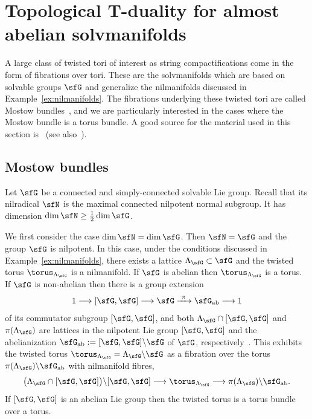 \section{Topological T-duality for almost abelian solvmanifolds}\label{sec:TdualityMostow}

A large class of twisted tori of interest as string compactifications
come in the form of fibrations over tori. These are the solvmanifolds
which are based on solvable groups $\sfG$ and generalize the
nilmanifolds discussed in Example~\ref{ex:nilmanifolds}. The fibrations
underlying these twisted tori are called {Mostow
 bundles}~\cite{Mostow1954}, and we are particularly interested in
the cases where the Mostow bundle is a torus bundle. A good source for
the material used in this section is~\cite{Bock2009} (see also~\cite{Console2016, OpreaTralle}).

\subsection{Mostow bundles}

Let $\sfG$ be
a connected and simply-connected solvable Lie group. Recall that its
nilradical $\sfN$ is the maximal connected nilpotent normal subgroup. It
has dimension $\dim\sfN\geq\frac12\dim\sfG$.

We first consider the case $\dim\sfN=\dim\sfG$. Then
$\sfN=\sfG$ and the group $\sfG$ is nilpotent. In this case, under the
conditions discussed in
Example~\ref{ex:nilmanifolds}, there exists a lattice
$\Lambda_\sfG\subset\sfG$ and the twisted torus $\torus_{\Lambda_\sfG}$ is a
nilmanifold. If $\sfG$ is abelian then $\torus_{\Lambda_\sfG}$ is a
torus. If $\sfG$ is non-abelian then there is a group extension
\[
1\longrightarrow [\sfG,\sfG]\longrightarrow\sfG\xrightarrow{ \ \pi \
}\sfG_{\rm ab}\longrightarrow 1
\]
of its commutator subgroup $[\sfG,\sfG]$,
and both $\Lambda_\sfG\cap[\sfG,\sfG]$ and $\pi(\Lambda_\sfG)$ are
lattices in the nilpotent Lie group $[\sfG,\sfG]$ and the
abelianization $\sfG_{\rm ab}:=[\sfG,\sfG]\backslash\sfG$ of $\sfG$, respectively~\cite{Corwin1990}. This exhibits
the twisted torus $\torus_{\Lambda_\sfG}=\Lambda_\sfG\backslash \sfG $ as a fibration over the torus
$\pi(\Lambda_\sfG)\backslash\sfG_{\rm ab}$ with
nilmanifold fibres,{\samepage
\[
\big(\Lambda_\sfG\cap[\sfG,\sfG]\big)\backslash[\sfG,\sfG] \longrightarrow \torus_{\Lambda_\sfG} \longrightarrow
\pi(\Lambda_\sfG)\backslash \sfG_{\rm ab} .
\]
If $[\sfG,\sfG]$ is an abelian Lie group then the twisted
torus is a torus bundle over a torus.}

